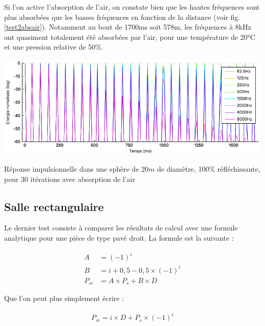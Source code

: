 Si l'on active l'absorption de l'air, on constate bien que les hautes fréquences sont plus absorbées que les basses fréquences en fonction de la distance (voir fig. \ref{test2absair}). Notamment au bout de 1700ms soit 578m, les fréquences à 8kHz ont quasiment totalement été absorbées par l'air, pour une température de 20°C et une pression relative de 50\%.


\begin{figureth}
	\includegraphics[width=\linewidth]{images/test2absair}
	\caption{Réponse impulsionnelle dans une sphère de $20m$ de diamètre, 100\% réfléchissante, pour 30 itérations avec absorption de l'air}
	\label{test2absair}
\end{figureth}

\subsection{Salle rectangulaire}

Le dernier test consiste à comparer les résultats de calcul avec une formule analytique pour une pièce de type pavé droit. La formule \cite[p. 182-189]{mcgovern} est la suivante : 

\begin{align}
A &=  (-1)^i \\
B &= i + 0,5 - 0,5 \times (-1)^i \\
P_{si} &= A \times P_s + B \times D
\end{align}

Que l'on peut plus simplement écrire :

\begin{align}
P_{si} = i \times D + P_s \times (-1)^i
\end{align}

